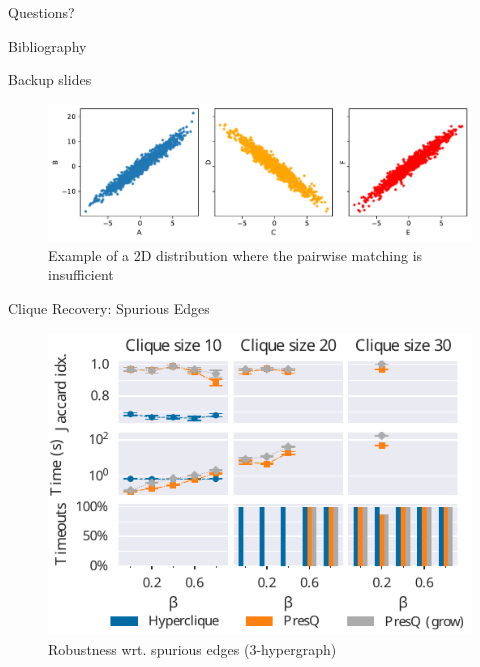 \documentclass[10pt,notes]{beamer}
\begin{document}
{
\begin{frame}[standout]
  \huge Questions?
\end{frame}
}

\appendix

\begin{frame}[allowframebreaks]{Bibliography}
\printbibliography[]
\end{frame}

{
\begin{frame}[standout]
  Backup slides
\end{frame}
}

\begin{frame}{}
\begin{figure}
    \centering
    \includegraphics[width=\textwidth]{no2ind.pdf}
    \caption{Example of a 2D distribution where the pairwise matching is insufficient}
\end{figure}
\end{frame}

\begin{frame}{Clique Recovery: Spurious Edges}
    \begin{figure}
        \centering
        \includegraphics{3hyper_beta}
        \caption{Robustness wrt. spurious edges (3-hypergraph)}
    \end{figure}
\end{frame}
\end{document}
